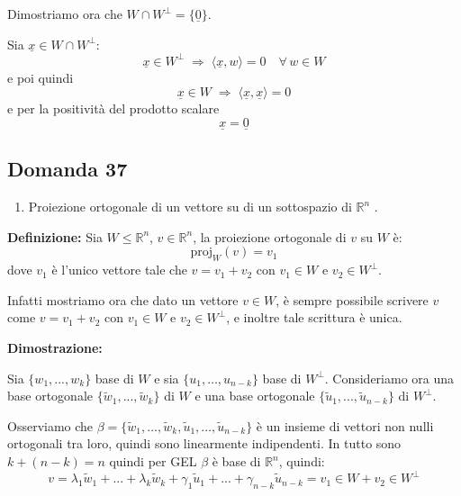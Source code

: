 \documentclass[
  a4paper,
]{article}
\providecommand{\tightlist}{%
  \setlength{\itemsep}{0pt}\setlength{\parskip}{0pt}}
\providecommand{\tightlist}{}
\begin{document}
\bigskip

Dimostriamo ora che \(W \cap W^{\perp} = \{\underline{0}\}\).

Sia \(\underline{x} \in W \cap W^{\perp}\): \[
\underline{x} \in W^{\perp} \;\Longrightarrow\; \langle \underline{x}, w \rangle = 0 \quad\forall\, w \in W
\] e poi quindi \[
\underline{x} \in W \;\Longrightarrow\; \langle \underline{x}, \underline{x} \rangle = 0 
\] e per la positività del prodotto scalare \[
\underline{x} = \underline{0}
\]

\hypertarget{domanda-37}{%
\subsection{Domanda 37}\label{domanda-37}}

\begin{observationbox}[Domanda]
\begin{enumerate}
\def\labelenumi{\arabic{enumi}.}
\setcounter{enumi}{36}
\tightlist
\item
  Proiezione ortogonale di un vettore su di un sottospazio di
  \(\mathbb{R}^n\) .
\end{enumerate}
\end{observationbox}

\textbf{Definizione:} Sia \(W \leq \mathbb{R}^n\),
\(v \in \mathbb{R}^n\), la proiezione ortogonale di \(v\) su \(W\) è: \[
\text{proj}_W(v) = v_1
\] dove \(v_1\) è l'unico vettore tale che \(v= v_1 + v_2\) con
\(v_1 \in W\) e \(v_2 \in W^\perp\).

\bigskip

Infatti mostriamo ora che dato un vettore \(v \in W\), è sempre
possibile scrivere \(v\) come \(v = v_1 + v_2\) con \(v_1 \in W\) e
\(v_2 \in W^\perp\), e inoltre tale scrittura è unica.

\textbf{Dimostrazione:}

Sia \(\{w_1, ..., w_k\}\) base di \(W\) e sia \(\{u_1,\dots, u_{n-k}\}\)
base di \(W^\perp\). Consideriamo ora una base ortogonale
\(\{\widetilde{w}_1, ..., \widetilde{w}_k\}\) di \(W\) e una base
ortogonale \(\{\widetilde{u}_1, ..., \widetilde{u}_{n-k}\}\) di
\(W^{\perp}\).

Osserviamo che
\(\beta = \{\widetilde{w}_1,\dots, \widetilde{w}_k, \widetilde{u}_1, \dots, \widetilde{u}_{n-k}\}\)
è un insieme di vettori non nulli ortogonali tra loro, quindi sono
linearmente indipendenti. In tutto sono \(k + (n-k) = n\) quindi per GEL
\(\beta\) è base di \(\mathbb{R}^n\), quindi: \[
v = \lambda_1 \widetilde{w}_1 + ... + \lambda_k\widetilde{w}_k + \gamma_1 \widetilde{u}_1 + ... + \gamma_{n-k} \widetilde{u}_{n-k} = v_1 \in W + v_2 \in W^\perp
\]
\end{document}
